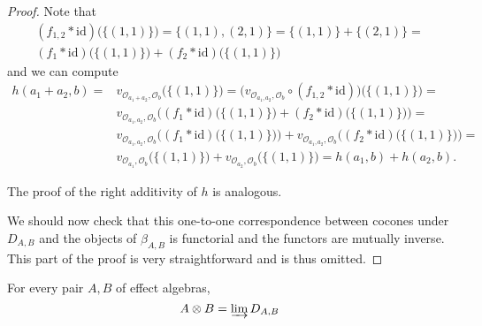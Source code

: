 \documentclass[smallextended]{svjour3}
\begin{document}
\begin{proof}
Note that 
\begin{align*}
(f_{1,2}*{\mathrm{id}})\bigl(\{(1,1)\}\bigr)=\{(1,1),(2,1)\}=\{(1,1)\}+\{(2,1)\}=\\(f_1*{\mathrm{id}})\bigl(\{(1,1)\}\bigr)+(f_2*{\mathrm{id}})\bigl(\{(1,1)\}\bigr)
\end{align*}
and we can compute
\begin{align*}
h(a_1+a_2,b)=&v_{{\mathcal O_{{a_1+a_2}}},{\mathcal O_{{b}}}}\bigl(\{(1,1)\}\bigr)=\bigl(v_{{\mathcal O_{{a_1,a_2}}},{\mathcal O_{{b}}}}\circ (f_{1,2}*{\mathrm{id}})\bigr)\bigl(\{(1,1)\}\bigr)=\\
&v_{{\mathcal O_{{a_1,a_2}}},{\mathcal O_{{b}}}}\bigl((f_1*{\mathrm{id}})\bigl(\{(1,1)\}\bigr)+(f_2*{\mathrm{id}})\bigl(\{(1,1)\}\bigr)\bigr)=\\
&v_{{\mathcal O_{{a_1,a_2}}},{\mathcal O_{{b}}}}\bigl((f_1*{\mathrm{id}})\bigl(\{(1,1)\}\bigr)\bigr)+v_{{\mathcal O_{{a_1,a_2}}},{\mathcal O_{{b}}}}\bigl((f_2*{\mathrm{id}})\bigl(\{(1,1)\}\bigr)\bigr)=\\
&v_{{\mathcal O_{{a_1}}},{\mathcal O_{{b}}}}\bigl(\{(1,1)\}\bigr)+v_{{\mathcal O_{{a_2}}},{\mathcal O_{{b}}}}\bigl(\{(1,1)\}\bigr)=h(a_1,b)+h(a_2,b).
\end{align*}

The proof of the right additivity of $h$ is analogous.

We should now check that this one-to-one correspondence between cocones under $D_{A,B}$ and
the objects of $\beta_{A,B}$ is functorial and the functors are mutually inverse. This
part of the proof is very straightforward and is thus omitted.
\end{proof}
\begin{corollary}
\label{coro:tensoriscolimit}
For every pair $A,B$ of effect algebras,
$$
A\otimes B=\varinjlim D_{A,B}
$$
\end{corollary}
\end{document}
